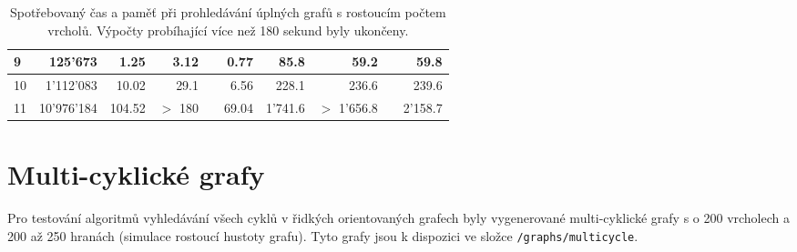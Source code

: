 \begin{table}[!h]
\begin{tabular}{|| l | r || r | r | r | r || r | r | r | r ||}
                \hline
                9 & 125'673 & 1.25 & 3.12 &  & 0.77 & 85.8 & 59.2 &  & 59.8 \\
                \hline
                10 & 1'112'083 & 10.02 & 29.1 &  & 6.56 & 228.1 & 236.6 &  & 239.6 \\
                \hline
                11 & 10'976'184 & 104.52 & $>$ 180 &  & 69.04 & 1'741.6 & $>$ 1'656.8 &  & 2'158.7 \\
                \hline
            \end{tabular}
            \caption{Spotřebovaný čas a paměť při prohledávání úplných grafů s rostoucím počtem vrcholů. Výpočty probíhající více než 180 sekund byly ukončeny.}
        \end{table}

    \section{Multi-cyklické grafy}
        Pro testování algoritmů vyhledávání všech cyklů v řidkých orientovaných grafech byly vygenerované multi-cyklické grafy s o 200 vrcholech a 200 až 250 hranách (simulace rostoucí hustoty grafu). Tyto grafy jsou k dispozici ve složce \texttt{/graphs/multicycle}.

